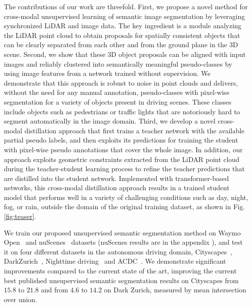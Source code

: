 \documentclass[runningheads]{llncs}
\newcommand{\supp}{appendix\xspace}
\begin{document}
The contributions of our work are threefold. First, we propose a novel method for cross-modal unsupervised learning of semantic image segmentation by leveraging synchronized LiDAR and image data. The key ingredient is a module analyzing the LiDAR point cloud to obtain proposals for spatially consistent objects that can be clearly separated from each other and from the ground plane in the 3D scene. 
Second, we show that these 3D object proposals can be aligned with input images and reliably clustered into semantically meaningful pseudo-classes 
by using image features from a network trained without supervision.
We demonstrate that this approach is robust to noise in point clouds and delivers, without the need for any manual annotation, pseudo-classes with pixel-wise segmentation for a variety of objects present in driving scenes. These classes include objects such as pedestrians or traffic lights that are notoriously hard to segment automatically in the image domain. Third, we develop a novel cross-modal distillation approach that first trains a teacher network with the available partial pseudo labels, and then exploits its predictions for training the student with pixel-wise pseudo annotations 
that cover the whole image.
In addition, our approach exploits geometric constraints extracted from the LiDAR point cloud during the teacher-student learning process to refine the teacher predictions that are distilled into the student network. Implemented with transformer-based networks, this cross-modal distillation approach 
results in a trained student model that performs well in a variety of challenging conditions such as day, night, fog, or rain, outside the domain of the original training dataset, as shown in Fig.\,\ref{fig:teaser}.

We train our proposed  unsupervised  semantic  segmentation  method  on Waymo Open~\cite{sun2020scalability} and nuScenes~\cite{nuscenes} datasets (nuScenes results are in the 
\supp
), and test it on four different datasets in the autonomous driving domain, Cityscapes~\cite{Cordts2016Cityscapes}, DarkZurich~\cite{SDV20}, Nighttime driving~\cite{daytime:2:nighttime} and ACDC~\cite{SDV21}. We demonstrate significant improvements compared to the current state of the art, improving the current best published unsupervised semantic segmentation results on Cityscapes from $15.8$ to $21.8$ and from $4.6$ to $14.2$ on Dark Zurich, measured by mean intersection over union.
\end{document}
